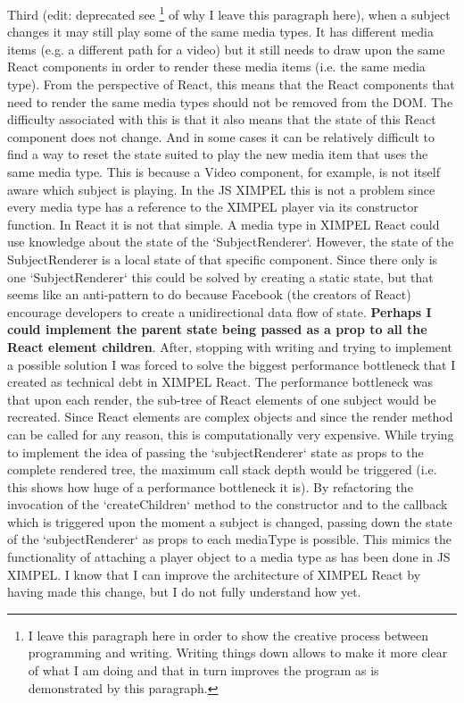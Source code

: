 Third (edit: deprecated see \footnote{I leave this paragraph here in order to show the creative process between programming and writing. Writing things down allows to make it more clear of what I am doing and that in turn improves the program as is demonstrated by this paragraph.} of why I leave this paragraph here), when a subject changes it may still play some of the same media types. It has different media items (e.g. a different path for a video) but it still needs to draw upon the same React components in order to render these media items (i.e. the same media type). From the perspective of React, this means that the React components that need to render the same media types should not be removed from the DOM. The difficulty associated with this is that it also means that the state of this React component does not change. And in some cases it can be relatively difficult to find a way to reset the state suited to play the new media item that uses the same media type. This is because a Video component, for example, is not itself aware which subject is playing. In the JS XIMPEL this is not a problem since every media type has a reference to the XIMPEL player via its constructor function. In React it is not that simple. A media type in XIMPEL React could use knowledge about the state of the `SubjectRenderer`. However, the state of the SubjectRenderer is a local state of that specific component. Since there only is one `SubjectRenderer` this could be solved by creating a static state, but that seems like an anti-pattern to do because Facebook (the creators of React) encourage developers to create a unidirectional data flow of state. \textbf{Perhaps I could implement the parent state being passed as a prop to all the React element children}. After, stopping with writing and trying to implement a possible solution I was forced to solve the biggest performance bottleneck that I created as technical debt in XIMPEL React. The performance bottleneck was that upon each render, the sub-tree of React elements of one subject would be recreated. Since React elements are complex objects and since the render method can be called for any reason, this is computationally very expensive. While trying to implement the idea of passing the `subjectRenderer` state as props to the complete rendered tree, the maximum call stack depth would be triggered (i.e. this shows how huge of a performance bottleneck it is). By refactoring the invocation of the `createChildren` method to the constructor and to the callback which is triggered upon the moment a subject is changed, passing down the state of the `subjectRenderer` as props to each mediaType is possible. This mimics the functionality of attaching a player object to a media type as has been done in JS XIMPEL. I know that I can improve the architecture of XIMPEL React by having made this change, but I do not fully understand how yet.

